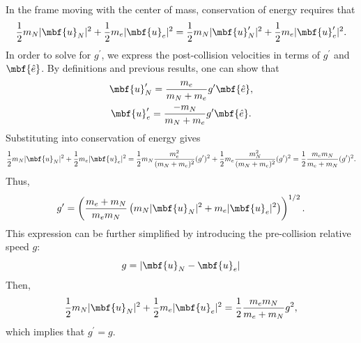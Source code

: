 In the frame moving with the center of mass, conservation of energy requires that
%
\begin{equation*}
\frac{1}{2} m_N |\mbf{u}_N|^2 + \frac{1}{2} m_e |\mbf{u}_e|^2
=
\frac{1}{2} m_N |\mbf{u}_N^{\prime}|^2 + \frac{1}{2} m_e |\mbf{u}_e^{\prime}|^2.
\end{equation*}
%
In order to solve for $g^{\prime}$, we express the post-collision
velocities in terms of $g^{\prime}$ and $\mbf{\hat{e}}$.  By
definitions and previous results, one can show that
%
\begin{gather*}
\mbf{u}_N^{\prime} = \frac{m_e}{m_N + m_e} g^{\prime} \mbf{\hat{e}},\\
\mbf{u}_e^{\prime} = \frac{-m_N}{m_N + m_e} g^{\prime} \mbf{\hat{e}}.
\end{gather*}
%
Substituting into conservation of energy gives
%
\begin{equation*}
\frac{1}{2} m_N |\mbf{u}_N|^2 + \frac{1}{2} m_e |\mbf{u}_e|^2
=
\frac{1}{2} m_N \frac{m_e^2}{(m_N+m_e)^2} (g^{\prime})^2
+
\frac{1}{2} m_e \frac{m_N^2}{(m_N+m_e)^2} (g^{\prime})^2
=
\frac{1}{2} \frac{m_e m_N}{m_e + m_N} (g^{\prime})^2.
\end{equation*}
%
Thus,
%
\begin{equation*}
g^{\prime} = \left( \frac{m_e + m_N}{m_e m_N} \left( m_N |\mbf{u}_N|^2 + m_e |\mbf{u}_e|^2 \right) \right)^{1/2}.
\end{equation*}
%
This expression can be further simplified by introducing the
pre-collision relative speed $g$:
%
\begin{equation*}
g = | \mbf{u}_N - \mbf{u}_e |
\end{equation*}
%
Then,
\begin{equation*}
\frac{1}{2} m_N |\mbf{u}_N|^2 + \frac{1}{2} m_e |\mbf{u}_e|^2
=
\frac{1}{2} \frac{m_e m_N}{m_e + m_N} g^2,
\end{equation*}
%
which implies that $g^{\prime} = g$.

